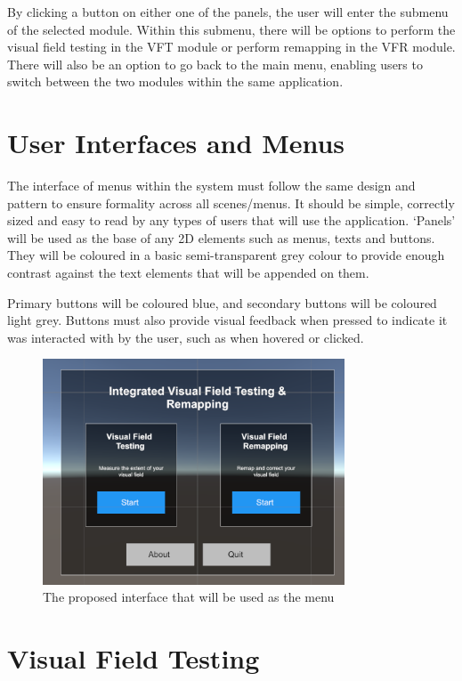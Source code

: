 \documentclass{l4proj}
\begin{document}
By clicking a button on either one of the panels, the user will enter the submenu of the selected module. Within this submenu, there will be options to perform the visual field testing in the VFT module or perform remapping in the VFR module. There will also be an option to go back to the main menu, enabling users to switch between the two modules within the same application.


\section{User Interfaces and Menus}

The interface of menus within the system must follow the same design and pattern to ensure formality across all scenes/menus. It should be simple, correctly sized and easy to read by any types of users that will use the application. `Panels' will be used as the base of any 2D elements such as menus, texts and buttons. They will be coloured in a basic semi-transparent grey colour to provide enough contrast against the text elements that will be appended on them. 

Primary buttons will be coloured blue, and secondary buttons will be coloured light grey. Buttons must also provide visual feedback when pressed to indicate it was interacted with by the user, such as when hovered or clicked. 

\begin{figure}[!h]
    \centering
    \includegraphics[width=0.8\textwidth]{images/VRMenuing CORE.png}
    \caption{The proposed interface that will be used as the menu}
    \label{fig:vrmenuing}
\end{figure}

\section{Visual Field Testing}
\end{document}
